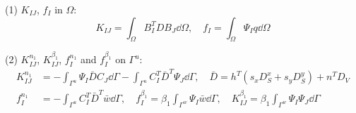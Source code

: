 (1) $K_{IJ}$, $f_I$ in $\Omega$:
\begin{equation}\label{eq:29}
K_{IJ}=\int_{\Omega}B_I^{T}DB_J\dd\Omega,\quad f_I=\int_{\Omega}\Psi_Iq\dd\Omega
\end{equation}

(2) $K_{IJ}^{n_1}$, $K_{IJ}^{\beta_1}$, $f_I^{n_1}$ and $f_I^{\beta_1}$ on $\Gamma^{u}$:
\begin{equation}\label{eq:30}
\begin{aligned}
K_{IJ}^{n_1}&=-\int_{\Gamma^{u}}\Psi_I\bar{D}C_J\dd\Gamma-\int_{\Gamma^{u}}C_I^{T}\bar{D}^{T}\Psi_J\dd\Gamma,\quad
\bar{D}=h^{T}\left(s_xD_S^{x}+s_yD_S^{y}\right)+n^{T}D_V\\
f_I^{n_1}&=-\int_{\Gamma^{u}}C_I^{T}\bar{D}^{T}\bar{w}\dd\Gamma,\quad
f_I^{\beta_1}=\beta_1\int_{\Gamma^{w}}\Psi_I\bar{w}\dd\Gamma,\quad
K_{IJ}^{\beta_1}=\beta_1\int_{\Gamma^{w}}\Psi_I\Psi_J\dd\Gamma
\end{aligned}
\end{equation}

